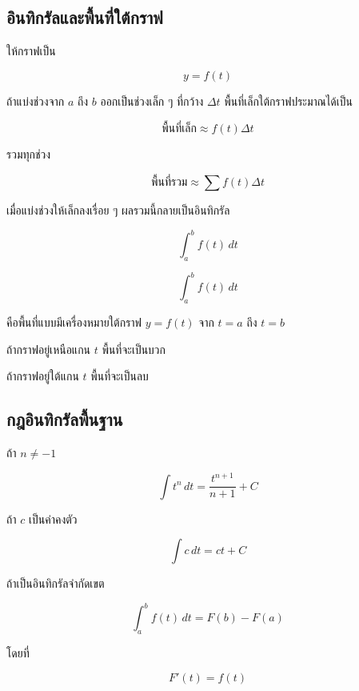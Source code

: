 \subsection{อินทิกรัลและพื้นที่ใต้กราฟ}

ให้กราฟเป็น

\[
y=f(t)
\]

ถ้าแบ่งช่วงจาก $a$ ถึง $b$ ออกเป็นช่วงเล็ก ๆ ที่กว้าง $\Delta t$ พื้นที่เล็กใต้กราฟประมาณได้เป็น

\[
\text{พื้นที่เล็ก}\approx f(t)\Delta t
\]

รวมทุกช่วง

\[
\text{พื้นที่รวม}\approx \sum f(t)\Delta t
\]

เมื่อแบ่งช่วงให้เล็กลงเรื่อย ๆ ผลรวมนี้กลายเป็นอินทิกรัล

\[
\int_a^b f(t)\,dt
\]

\begin{tcolorbox}[title=ความหมายของอินทิกรัล]
\[
\int_a^b f(t)\,dt
\]

คือพื้นที่แบบมีเครื่องหมายใต้กราฟ $y=f(t)$ จาก $t=a$ ถึง $t=b$

ถ้ากราฟอยู่เหนือแกน $t$ พื้นที่จะเป็นบวก

ถ้ากราฟอยู่ใต้แกน $t$ พื้นที่จะเป็นลบ
\end{tcolorbox}

\vspace{1em}
\begin{center}
\end{center}

\subsection{กฎอินทิกรัลพื้นฐาน}

\begin{tcolorbox}[title=กฎอินทิกรัลพื้นฐาน]
ถ้า $n\neq -1$

\[
\int t^n\,dt=\frac{t^{n+1}}{n+1}+C
\]

ถ้า $c$ เป็นค่าคงตัว

\[
\int c\,dt=ct+C
\]

ถ้าเป็นอินทิกรัลจำกัดเขต

\[
\int_a^b f(t)\,dt=F(b)-F(a)
\]

โดยที่

\[
F'(t)=f(t)
\]
\end{tcolorbox}


